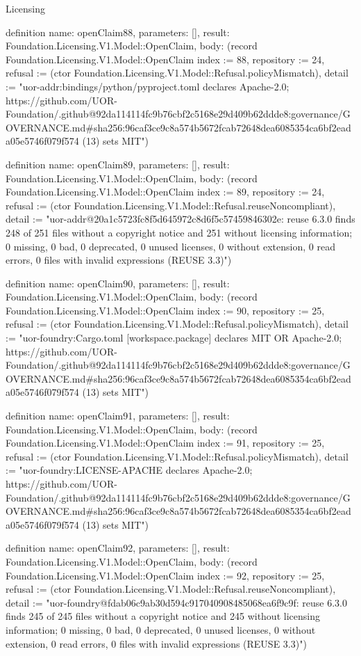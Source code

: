\begin{lexlean}{Licensing}
\begin{semanticmodule}
definition{
  name: openClaim88,
  parameters: [],
  result: Foundation.Licensing.V1.Model::OpenClaim,
  body: (record Foundation.Licensing.V1.Model::OpenClaim {index := 88, repository := 24, refusal := (ctor Foundation.Licensing.V1.Model::Refusal.policyMismatch), detail := "uor-addr:bindings/python/pyproject.toml declares Apache-2.0; https://github.com/UOR-Foundation/.github@92da114114fc9b76cbf2c5168e29d409b62ddde8:governance/GOVERNANCE.md#sha256:96caf3ce9c8a574b5672fcab72648dea6085354ca6bf2eada05e5746f079f574 (13) sets MIT"})
}

definition{
  name: openClaim89,
  parameters: [],
  result: Foundation.Licensing.V1.Model::OpenClaim,
  body: (record Foundation.Licensing.V1.Model::OpenClaim {index := 89, repository := 24, refusal := (ctor Foundation.Licensing.V1.Model::Refusal.reuseNoncompliant), detail := "uor-addr@20a1c5723fc8f5d645972c8d6f5c57459846302e: reuse 6.3.0 finds 248 of 251 files without a copyright notice and 251 without licensing information; 0 missing, 0 bad, 0 deprecated, 0 unused licenses, 0 without extension, 0 read errors, 0 files with invalid expressions (REUSE 3.3)"})
}

definition{
  name: openClaim90,
  parameters: [],
  result: Foundation.Licensing.V1.Model::OpenClaim,
  body: (record Foundation.Licensing.V1.Model::OpenClaim {index := 90, repository := 25, refusal := (ctor Foundation.Licensing.V1.Model::Refusal.policyMismatch), detail := "uor-foundry:Cargo.toml [workspace.package] declares MIT OR Apache-2.0; https://github.com/UOR-Foundation/.github@92da114114fc9b76cbf2c5168e29d409b62ddde8:governance/GOVERNANCE.md#sha256:96caf3ce9c8a574b5672fcab72648dea6085354ca6bf2eada05e5746f079f574 (13) sets MIT"})
}

definition{
  name: openClaim91,
  parameters: [],
  result: Foundation.Licensing.V1.Model::OpenClaim,
  body: (record Foundation.Licensing.V1.Model::OpenClaim {index := 91, repository := 25, refusal := (ctor Foundation.Licensing.V1.Model::Refusal.policyMismatch), detail := "uor-foundry:LICENSE-APACHE declares Apache-2.0; https://github.com/UOR-Foundation/.github@92da114114fc9b76cbf2c5168e29d409b62ddde8:governance/GOVERNANCE.md#sha256:96caf3ce9c8a574b5672fcab72648dea6085354ca6bf2eada05e5746f079f574 (13) sets MIT"})
}

definition{
  name: openClaim92,
  parameters: [],
  result: Foundation.Licensing.V1.Model::OpenClaim,
  body: (record Foundation.Licensing.V1.Model::OpenClaim {index := 92, repository := 25, refusal := (ctor Foundation.Licensing.V1.Model::Refusal.reuseNoncompliant), detail := "uor-foundry@fdab06c9ab30d594c917040908485068ea6f9c9f: reuse 6.3.0 finds 245 of 245 files without a copyright notice and 245 without licensing information; 0 missing, 0 bad, 0 deprecated, 0 unused licenses, 0 without extension, 0 read errors, 0 files with invalid expressions (REUSE 3.3)"})
}


\end{semanticmodule}
\end{lexlean}
